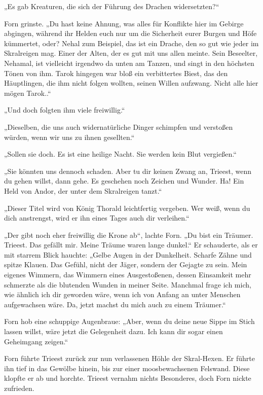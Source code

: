 „Es gab Kreaturen, die sich der Führung des Drachen widersetzten?“

Forn grinste. „Du hast keine Ahnung, was alles für Konflikte hier im Gebirge abgingen, während ihr Helden euch nur um die Sicherheit eurer Burgen und Höfe kümmertet, oder? Nehal zum Beispiel, das ist ein Drache, den so gut wie jeder im Skralreigen mag. Einer der Alten, der es gut mit uns allen meinte. Sein Beseelter, Nehamal, ist vielleicht irgendwo da unten am Tanzen, und singt in den höchsten Tönen von ihm. Tarok hingegen war bloß ein verbittertes Biest, das den Häuptlingen, die ihm nicht folgen wollten, seinen Willen aufzwang. Nicht alle hier mögen Tarok..“

„Und doch folgten ihm viele freiwillig.“

„Dieselben, die uns auch widernatürliche Dinger schimpfen und verstoßen würden, wenn wir uns zu ihnen gesellten.“

„Sollen sie doch. Es ist eine heilige Nacht. Sie werden kein Blut vergießen.“

„Sie könnten uns dennoch schaden. Aber tu dir keinen Zwang an, Trieest, wenn du gehen willst, dann gehe. Es geschehen noch Zeichen und Wunder. Ha! Ein Held von Andor, der unter dem Skralreigen tanzt.“

„Dieser Titel wird von König Thorald leichtfertig vergeben. Wer weiß, wenn du dich anstrengst, wird er ihn eines Tages auch dir verleihen.“

„Der gibt noch eher freiwillig die Krone ab“, lachte Forn. „Du bist ein Träumer. Trieest. Das gefällt mir. Meine Träume waren lange dunkel.“ Er schauderte, als er mit starrem Blick hauchte: „Gelbe Augen in der Dunkelheit. Scharfe Zähne und spitze Klauen. Das Gefühl, nicht der Jäger, sondern der Gejagte zu sein. Mein eigenes Wimmern, das Wimmern eines Ausgestoßenen, dessen Einsamkeit mehr schmerzte als die blutenden Wunden in meiner Seite. Manchmal frage ich mich, wie ähnlich ich dir geworden wäre, wenn ich von Anfang an unter Menschen aufgewachsen wäre. Da, jetzt machst du mich auch zu einem Träumer.“

Forn hob eine schuppige Augenbraue: „Aber, wenn du deine neue Sippe im Stich lassen willst, wäre jetzt die Gelegenheit dazu. Ich kann dir sogar einen Geheimgang zeigen.“

Forn führte Trieest zurück zur nun verlassenen Höhle der Skral-Hexen. Er führte ihn tief in das Gewölbe hinein, bis zur einer moosbewachsenen Felswand. Diese klopfte er ab und horchte. Trieest vernahm nichts Besonderes, doch Forn nickte zufrieden.


